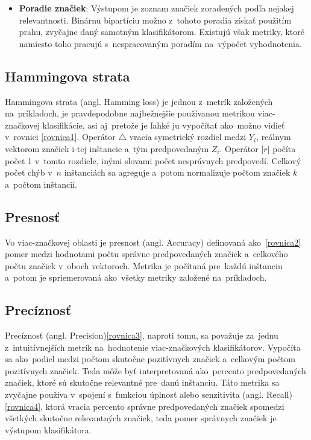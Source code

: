 \begin{itemize}
\begin{itemize}
    \item \textbf{Poradie značiek}: Výstupom je zoznam značiek zoradených podľa nejakej relevantnosti. Binárnu bipartíciu možno z~tohoto poradia získať použitím prahu, zvyčajne daný samotným klasifikátorom. Existujú však metriky, ktoré namiesto toho pracujú s~nespracovaným poradím na~výpočet vyhodnotenia.
    \end{itemize}
\end{itemize}

\subsection*{Hammingova strata} 
Hammingova strata (angl. Hamming loss) je jednou z~metrík založených na~príkladoch, je pravdepodobne najbežnejšie používanou metrikou viac-značkovej klasifikácie, asi aj~pretože je ľahké ju vypočítať ako~možno vidieť v~rovnici \eqref{rovnica1}. Operátor \(\bigtriangleup\) vracia symetrický rozdiel medzi \(Y_{i}\), reálnym vektorom značiek i-tej inštancie a~tým predpovedaným \(Z_{i}\). Operátor \(|r|\) počíta počet 1 v~tomto rozdiele, inými slovami počet nesprávnych predpovedí. Celkový počet chýb v~\(n\) inštanciách sa agreguje a~potom normalizuje počtom značiek \(k\) a~počtom inštancií.

\subsection*{Presnosť} 

Vo viac-značkovej oblasti je presnosť (angl. Accuracy) definovaná ako~\eqref{rovnica2} pomer medzi hodnotami počtu správne predpovedaných značiek a~celkového počtu značiek v~oboch vektoroch. Metrika je počítaná pre~každú inštanciu a~potom je spriemerovaná ako~všetky metriky založené na~príkladoch.

\subsection*{Precíznosť} 
Precíznosť (angl. Precision)\eqref{rovnica3}, naproti tomu, sa považuje za~jednu z~intuitívnejších metrík na~hodnotenie viac-značkových klasifikátorov. Vypočíta sa ako~podiel medzi počtom skutočne pozitívnych značiek a~celkovým počtom pozitívnych značiek. Teda môže byť interpretovaná ako~percento predpovedaných značiek, ktoré sú skutočne relevantné pre~danú inštanciu. Táto metrika sa zvyčajne používa v~spojení s~funkciou úplnosť alebo senzitivita (angl. Recall) \eqref{rovnica4}, ktorá vracia percento správne predpovedaných značiek spomedzi všetkých skutočne relevantných značiek, teda pomer správnych značiek je výstupom klasifikátora.

